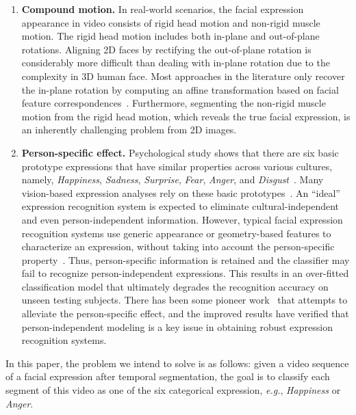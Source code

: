 \documentclass[journal]{IEEEtran}
\begin{document}
\begin{enumerate}

\item \textbf{Compound motion.} In real-world scenarios, the facial expression appearance in video consists of rigid head motion and non-rigid muscle motion. The rigid head motion includes both in-plane and out-of-plane rotations. Aligning 2D faces by rectifying the out-of-plane rotation is considerably more difficult than dealing with in-plane rotation due to the complexity in 3D human face. Most approaches in the literature only recover the in-plane rotation by computing an affine transformation based on facial feature correspondences~\cite{Bartlett_FG11,Valstar_FERA11}. Furthermore, segmenting the non-rigid muscle motion from the rigid head motion, which reveals the true facial expression, is an inherently challenging problem from 2D images.

\item \textbf{Person-specific effect.} Psychological study shows that there are six basic prototype expressions that have similar properties across various cultures, namely, \textit{Happiness}, \textit{Sadness}, \textit{Surprise}, \textit{Fear}, \textit{Anger}, and \textit{Disgust}~\cite{Fridlund_87}.  Many vision-based expression analyses rely on these basic prototypes~\cite{Pantic_PAMI00}.  An ``ideal'' expression recognition system is expected to eliminate cultural-independent and even person-independent information. However, typical facial expression recognition systems use generic appearance or geometry-based features to characterize an expression, without taking into account the person-specific property~\cite{Bartlett_FG11,Valstar_SMCB12}. Thus, person-specific information is retained and the classifier may fail to recognize person-independent expressions. This results in an over-fitted classification model that ultimately degrades the recognition accuracy on unseen testing subjects. There has been some pioneer work~\cite{Yang_SMCB12,Dahmane_TMM14} that attempts to alleviate the person-specific effect, and the improved results have verified that person-independent modeling is a key issue in obtaining robust expression recognition systems.

\end{enumerate}

In this paper, the problem we intend to solve is as follows: given a video sequence of a facial expression after temporal segmentation, the goal is to classify each segment of this video as one of the six categorical expression, \textit{e.g.}, \textit{Happiness} or \textit{Anger}. 
\end{document}
